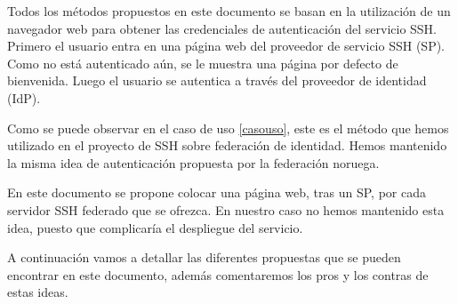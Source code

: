     Todos los métodos propuestos en este documento se basan en la
    utilización de un navegador web para obtener las credenciales
    de autenticación del servicio SSH. Primero el usuario entra en
    una página web del proveedor de servicio SSH (SP). Como no está
    autenticado aún, se le muestra una página por defecto de
    bienvenida. Luego el usuario se autentica a través del
    proveedor de identidad (IdP).

    Como se puede observar en el caso de uso \ref{casouso}, este es el
    método que hemos utilizado en el proyecto de SSH sobre federación
    de identidad. Hemos mantenido la misma idea de autenticación
    propuesta por la federación noruega.

    En este documento se propone colocar una página web, tras un SP,
    por cada servidor SSH federado que se ofrezca. En nuestro caso no
    hemos mantenido esta idea, puesto que complicaría el
    despliegue del servicio.

    A continuación vamos a detallar las diferentes propuestas que se
    pueden encontrar en este documento, además comentaremos los pros y
    los contras de estas ideas.

